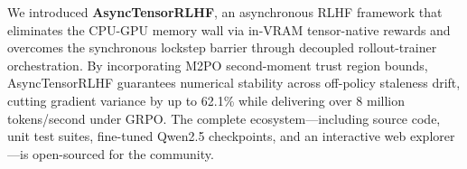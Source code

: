 \documentclass[10pt,twocolumn,letterpaper]{article}
\begin{document}
We introduced \textbf{AsyncTensorRLHF}, an asynchronous RLHF framework that eliminates the CPU-GPU memory wall via in-VRAM tensor-native rewards and overcomes the synchronous lockstep barrier through decoupled rollout-trainer orchestration. By incorporating M2PO second-moment trust region bounds, AsyncTensorRLHF guarantees numerical stability across off-policy staleness drift, cutting gradient variance by up to 62.1\% while delivering over 8 million tokens/second under GRPO. The complete ecosystem---including source code, unit test suites, fine-tuned Qwen2.5 checkpoints, and an interactive web explorer---is open-sourced for the community.



\end{document}
